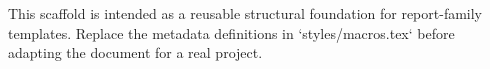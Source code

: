 \begin{titlepage}
\centering
\vspace*{2cm}

{\Huge\bfseries \DocumentTitle\par}
\vspace{0.5cm}
{\Large \DocumentSubtitle\par}

\vfill

{\large \DocumentAuthor\par}
\vspace{0.25cm}
{\large \DocumentInstitution\par}
\vspace{0.25cm}
{\large \DocumentDate\par}

\vfill

\begin{minipage}{0.8\textwidth}
\centering
\small
This scaffold is intended as a reusable structural foundation for report-family templates. Replace the metadata definitions in `styles/macros.tex` before adapting the document for a real project.
\end{minipage}

\end{titlepage}
